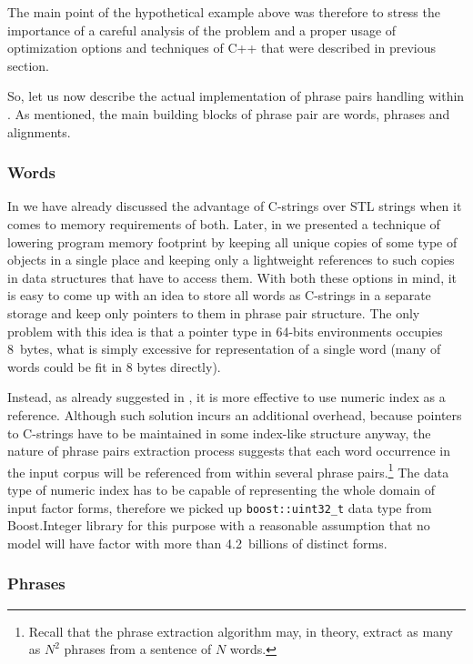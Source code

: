 The main point of the hypothetical example above was therefore to stress the importance of
a careful analysis of the problem and a proper usage of optimization options and techniques
of C++ that were described in previous section.

So, let us now describe the actual implementation of phrase pairs handling within \eppex{}.
As mentioned, the main building blocks of phrase pair are words, phrases and alignments.

\subsubsection*{Words}

In  we have already discussed the advantage of C-strings over STL strings
when it comes to memory requirements of both.
Later, in  we presented a technique of lowering program memory
footprint by keeping all unique copies of some type of objects in a single place and keeping
only a lightweight references to such copies in data structures that have to access them.
With both these options in mind, it is easy to come up with an idea to store all words as
C-strings in a separate storage and keep only pointers to them in phrase pair structure.
The only problem with this idea is that a pointer type in 64-bits environments occupies
8~bytes, what is simply excessive for representation of a single word (many of words could
be fit in 8 bytes directly).

Instead, as already suggested in , it is more effective to
use numeric index as a reference.
Although such solution incurs an additional overhead, because pointers to C-strings have to
be maintained in some index-like structure anyway, the nature of phrase pairs extraction
process suggests that each word occurrence in the input corpus will be referenced from within
several phrase pairs.\footnote{Recall that the phrase extraction algorithm may, in theory,
extract as many as $N^2$ phrases from a sentence of $N$ words.}
The data type of numeric index has to be capable of representing the whole domain of input
factor forms, therefore we picked up \texttt{boost::uint32_t} data type from Boost.Integer
library for this purpose with a reasonable assumption that no model will have factor with
more than 4.2~billions of distinct forms.

\subsubsection*{Phrases}

